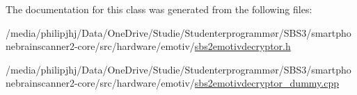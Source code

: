 The documentation for this class was generated from the following files\-:\begin{DoxyCompactItemize}
\item 
/media/philipjhj/\-Data/\-One\-Drive/\-Studie/\-Studenterprogrammør/\-S\-B\-S3/smartphonebrainscanner2-\/core/src/hardware/emotiv/\hyperlink{sbs2emotivdecryptor_8h}{sbs2emotivdecryptor.\-h}\item 
/media/philipjhj/\-Data/\-One\-Drive/\-Studie/\-Studenterprogrammør/\-S\-B\-S3/smartphonebrainscanner2-\/core/src/hardware/emotiv/\hyperlink{sbs2emotivdecryptor__dummy_8cpp}{sbs2emotivdecryptor\-\_\-dummy.\-cpp}\end{DoxyCompactItemize}
